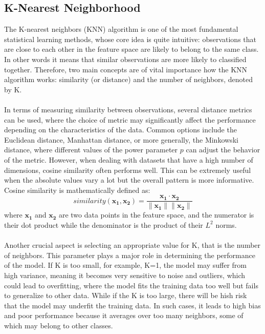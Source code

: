 \subsection{K-Nearest Neighborhood}\label{subsec:knn}
The K-nearest neighbors (KNN) algorithm is one of the most fundamental statistical learning methods, whose core idea is quite intuitive: observations that are close to each other in the feature space are likely to belong to the same class. In other words it means that similar observations are more likely to classified together. Therefore, two main concepts are of vital importance how the KNN algorithm works: similarity (or distance) and the number of neighbors, denoted by K. \\
\\
In terms of measuring similarity between observations, several distance metrics can be used, where the choice of metric may significantly affect the performance depending on the characteristics of the data. Common options include the Euclidean distance, Manhattan distance, or more generally, the Minkowski distance, where different values of the power parameter $p$ can adjust the behavior of the metric. However, when dealing with datasets that have a high number of dimensions, cosine similarity often performs well. This can be extremely useful when the absolute values vary a lot but the overall pattern is more informative. Cosine similarity is mathematically defined as:\\
\begin{equation}
	similarity(\mathbf{x_1},\mathbf{x_2})=\frac{\mathbf{x_1} \cdot \mathbf{x_2}}{\| \mathbf{x_1} \| \| \mathbf{x_2} \|}
\end{equation} 
where $\mathbf{x_1}$ and $\mathbf{x_2}$ are two data points in the feature space, and the numerator is their dot product while the denominator is the product of their $L^2$ norms.\\
\\
Another crucial aspect is selecting an appropriate value for K, that is the number of neighbors. This parameter plays a major role in determining the performance of the model. If K is too small, for example, K=1, the model may suffer from high variance, meaning it becomes very sensitive to noise and outliers, which could lead to overfitting, where the model fits the training data too well but fails to generalize to other data. While if the K is too large, there will be hish risk that the model may underfit the training data. In such cases, it leads to high bias and poor performance because it averages over too many neighbors, some of which may belong to other classes. \\
